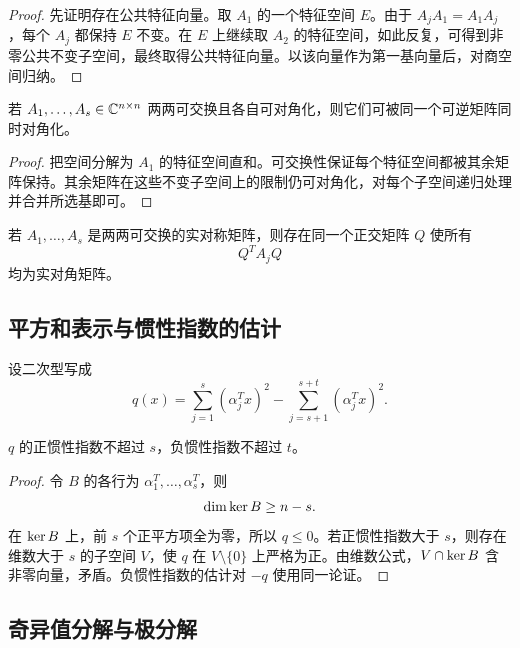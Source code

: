 \begin{proof}
先证明存在公共特征向量。取 $A_1$ 的一个特征空间 $E$。由于 $A_jA_1=A_1A_j$，每个 $A_j$ 都保持 $E$ 不变。在 $E$ 上继续取 $A_2$ 的特征空间，如此反复，可得到非零公共不变子空间，最终取得公共特征向量。以该向量作为第一基向量后，对商空间归纳。
\end{proof}

\begin{theorem}[同时对角化]
若 $A_1,\ldots,A_s\in\mathbb C^{n\times n}$ 两两可交换且各自可对角化，则它们可被同一个可逆矩阵同时对角化。
\end{theorem}

\begin{proof}
把空间分解为 $A_1$ 的特征空间直和。可交换性保证每个特征空间都被其余矩阵保持。其余矩阵在这些不变子空间上的限制仍可对角化，对每个子空间递归处理并合并所选基即可。
\end{proof}

\begin{corollary}
若 $A_1,\ldots,A_s$ 是两两可交换的实对称矩阵，则存在同一个正交矩阵 $Q$ 使所有
\begin{equation}
 Q^TA_jQ
\end{equation}
均为实对角矩阵。
\end{corollary}

\subsection{平方和表示与惯性指数的估计}

设二次型写成
\begin{equation}
 q(x)=\sum_{j=1}^s(\alpha_j^Tx)^2
 -\sum_{j=s+1}^{s+t}(\alpha_j^Tx)^2.
\end{equation}

\begin{proposition}
$q$ 的正惯性指数不超过 $s$，负惯性指数不超过 $t$。
\end{proposition}

\begin{proof}
令 $B$ 的各行为 $\alpha_1^T,\ldots,\alpha_s^T$，则
\begin{equation}
 \dim\operatorname{ker} B\geq n-s.
\end{equation}
在 $\operatorname{ker} B$ 上，前 $s$ 个正平方项全为零，所以 $q\leq0$。若正惯性指数大于 $s$，则存在维数大于 $s$ 的子空间 $V$，使 $q$ 在 $V\setminus\{0\}$ 上严格为正。由维数公式，$V\cap\operatorname{ker} B$ 含非零向量，矛盾。负惯性指数的估计对 $-q$ 使用同一论证。
\end{proof}

\subsection{奇异值分解与极分解}

